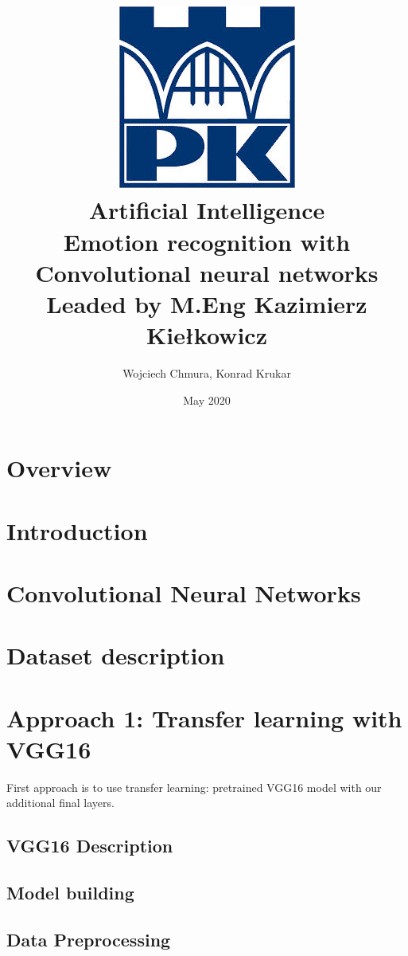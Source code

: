 \documentclass{article}
\title{
    {\includegraphics{./images/logo_pk.jpg}}\\
    {Artificial Intelligence}\\
    {\large Emotion recognition with Convolutional neural networks}\\
     \small Leaded by M.Eng Kazimierz Kiełkowicz
    }
\author{Wojciech Chmura, Konrad Krukar}
\date{May 2020}
\begin{document}
    \maketitle
    \newpage
    \tableofcontents
    \newpage
    
    \section{Overview}
    
    
    \section{Introduction}
        
    
    \newpage
    \section{Convolutional Neural Networks}
        
    
    \newpage
    \section{Dataset description}
    
    
    \newpage
    \section{Approach 1: Transfer learning with VGG16}
    First approach is to use transfer learning: pretrained VGG16 model with our additional final layers.
 
    	\subsection{VGG16 Description}
    	
    	
    	\newpage
    	\subsection{Model building}
    	
    
    	\newpage
    	\subsection{Data Preprocessing}
    	
    	
\end{document}
